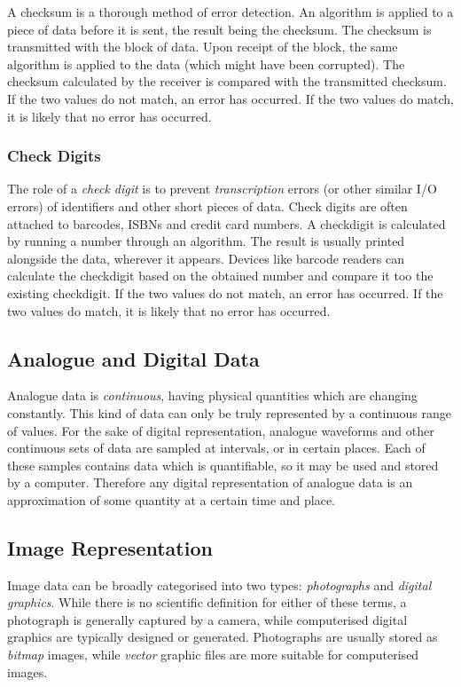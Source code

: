 \documentclass[9pt]{article}
\begin{document}
A checksum is a thorough method of error detection. An algorithm is applied to a piece of data before it is sent, the result being the checksum. The checksum is transmitted with the block of data. Upon receipt of the block, the same algorithm is applied to the data (which might have been corrupted). The checksum calculated by the receiver is compared with the transmitted checksum. If the two values do not match, an error has occurred. If the two values do match, it is likely that no error has occurred.

\subsubsection{Check Digits}
\label{sec:orgf026f22}

The role of a \emph{check digit} is to prevent \emph{transcription} errors (or other similar I/O errors) of identifiers and other short pieces of data. Check digits are often attached to barcodes, ISBNs and credit card numbers.
A checkdigit is calculated by running a number through an algorithm. The result is usually printed alongside the data, wherever it appears. Devices like barcode readers can calculate the checkdigit based on the obtained number and compare it too the existing checkdigit. If the two values do not match, an error has occurred. If the two values do match, it is likely that no error has occurred.

\subsection{Analogue and Digital Data}
\label{sec:org498c861}

Analogue data is \emph{continuous}, having physical quantities which are changing constantly. This kind of data can only be truly represented by a continuous range of values. For the sake of digital representation, analogue waveforms and other continuous sets of data are sampled at intervals, or in certain places. Each of these samples contains data which is quantifiable, so it may be used and stored by a computer. Therefore any digital representation of analogue data is an approximation of some quantity at a certain time and place.

\subsection{Image Representation}
\label{sec:org750c1f1}

Image data can be broadly categorised into two types: \emph{photographs} and \emph{digital graphics}. While there is no scientific definition for either of these terms, a photograph is generally captured by a camera, while computerised digital graphics are typically designed or generated. Photographs are usually stored as \emph{bitmap} images, while \emph{vector} graphic files are more suitable for computerised images.
\end{document}
